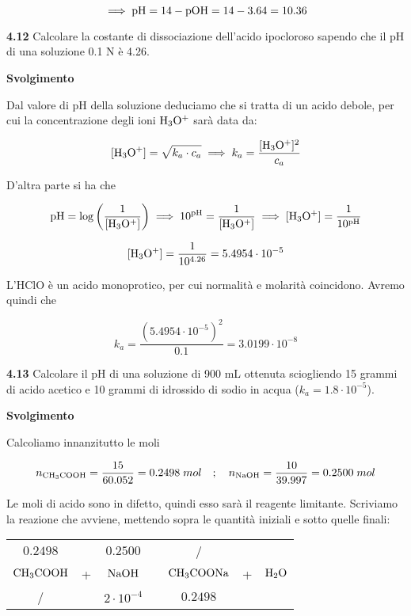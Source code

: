 $$\implies \rm pH=14 - pOH
=14-3.64=10.36$$

\vspace{0.2cm}\textbf{4.12} Calcolare la costante di dissociazione dell'acido ipocloroso sapendo che il pH di una soluzione 0.1 N è 4.26.

\vspace{0.2cm}\large\textbf{Svolgimento}\normalsize

\vspace{0.2cm}Dal valore di pH della soluzione deduciamo che si tratta di un acido debole, per cui la concentrazione degli ioni $\rm H_3O^+$ sarà data da:

$$[\text{H}_3\text{O}^+]=\sqrt{k_a \cdot c_a}
\implies
k_a=\frac{[\rm H_3O^+]^2}{c_a}$$

D'altra parte si ha che

$$\rm pH=\log{\left( \frac{1}{[H_3O^+]} \right)}
\implies
10^{pH}=\frac{1}{[H_3O^+]}
\implies
[H_3O^+]=\frac{1}{10^{pH}}$$

$$\rm [H_3O^+]=\frac{1}{10^{4.26}}=5.4954 \cdot 10^{-5}$$

L'HClO è un acido monoprotico, per cui normalità e molarità coincidono. Avremo quindi che

$$k_a=\frac{(5.4954 \cdot 10^{-5})^2}{0.1}
=3.0199 \cdot 10^{-8}$$

\vspace{0.2cm}\textbf{4.13} Calcolare il pH di una soluzione di 900 mL ottenuta sciogliendo 15 grammi di acido acetico e 10 grammi di idrossido di sodio in acqua ($k_a = 1.8 \cdot 10^{-5}$).

\vspace{0.2cm}\large\textbf{Svolgimento}\normalsize

\vspace{0.2cm}Calcoliamo innanzitutto le moli

$$n_{\rm CH_3COOH}=\frac{15}{60.052}=0.2498\;mol
\quad;\quad
n_{\rm NaOH}=\frac{10}{39.997}=0.2500\;mol$$

Le moli di acido sono in difetto, quindi esso sarà il reagente limitante. Scriviamo la reazione che avviene, mettendo sopra le quantità iniziali e sotto quelle finali:

\begin{center}
    \begin{tabular}{ccccccc}
        $0.2498$ &  & $0.2500$ & & / &&\\
        $\rm CH_3COOH$ & + & $\rm NaOH$ & \ce{->} & $\rm CH_3COONa$ & + & $\rm H_2O$\\
        / &  & $2 \cdot 10^{-4}$ & & $0.2498$ &&\\
    \end{tabular}
\end{center}

